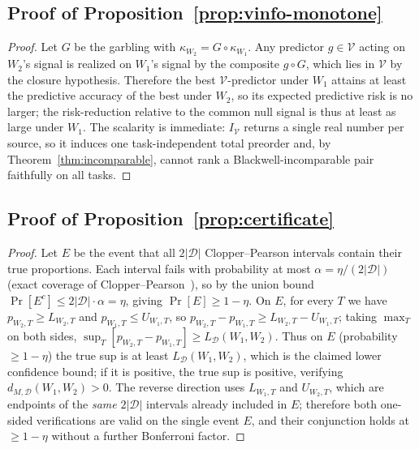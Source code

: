 \documentclass[11pt]{article}
\theoremstyle{plain}
\theoremstyle{definition}
\theoremstyle{remark}
\newcommand{\Dcal}{\mathcal{D}}
\newcommand{\Vcal}{\mathcal{V}}
\begin{document}
\subsection*{Proof of Proposition~\ref{prop:vinfo-monotone}}
\begin{proof}
Let $G$ be the garbling with $\kappa_{W_2}=G\circ\kappa_{W_1}$. Any predictor $g\in\Vcal$ acting
on $W_2$'s signal is realized on $W_1$'s signal by the composite $g\circ G$, which lies in $\Vcal$
by the closure hypothesis. Therefore the best $\Vcal$-predictor under $W_1$ attains at least the
predictive accuracy of the best under $W_2$, so its expected predictive risk is no larger; the
risk-reduction relative to the common null signal is thus at least as large under $W_1$. The
scalarity is immediate: $I_{\Vcal}$ returns a single real number per source, so it induces one
task-independent total preorder and, by Theorem~\ref{thm:incomparable}, cannot rank a
Blackwell-incomparable pair faithfully on all tasks.
\end{proof}

\subsection*{Proof of Proposition~\ref{prop:certificate}}
\begin{proof}
Let $E$ be the event that all $2|\Dcal|$ Clopper--Pearson intervals contain their true proportions.
Each interval fails with probability at most $\alpha=\eta/(2|\Dcal|)$ (exact coverage of
Clopper--Pearson~\citep{clopperpearson1934}), so by the union bound $\Pr[E^c]\le 2|\Dcal|\cdot\alpha =
\eta$, giving $\Pr[E]\ge 1-\eta$. On $E$, for every $T$ we have $p_{W_2,T}\ge L_{W_2,T}$ and
$p_{W_1,T}\le U_{W_1,T}$, so $p_{W_2,T}-p_{W_1,T} \ge L_{W_2,T}-U_{W_1,T}$; taking $\max_T$ on both
sides, $\sup_T[p_{W_2,T}-p_{W_1,T}] \ge L_{\Dcal}(W_1,W_2)$. Thus on $E$ (probability $\ge 1-\eta$) the
true sup is at least $L_{\Dcal}(W_1,W_2)$, which is the claimed lower confidence bound; if it is positive,
the true sup is positive, verifying $d_{M,\Dcal}(W_1,W_2)>0$. The reverse direction uses
$L_{W_1,T}$ and $U_{W_2,T}$, which are endpoints of the \emph{same} $2|\Dcal|$ intervals already
included in $E$; therefore both one-sided verifications are valid on the single event $E$, and their
conjunction holds at $\ge 1-\eta$ without a further Bonferroni factor.
\end{proof}
\end{document}
